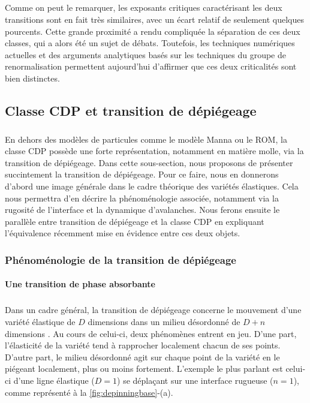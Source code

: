 \subparagraph{}Comme on peut le remarquer, les exposants critiques caractérisant les deux transitions sont en fait très similaires, avec un écart relatif de seulement quelques pourcents. Cette grande proximité a rendu compliquée la séparation de ces deux classes, qui a alors été un sujet de débats. Toutefois, les techniques numériques actuelles et des arguments analytiques basés sur les techniques du groupe de renormalisation permettent aujourd'hui d'affirmer que ces deux criticalités sont bien distinctes.

\subsection{Classe CDP et transition de dépiégeage}

\subparagraph{}En dehors des modèles de particules comme le modèle Manna ou le ROM, la classe CDP possède une forte représentation, notamment en matière molle, via la transition de dépiégeage. Dans cette sous-section, nous proposons de présenter succintement la transition de dépiégeage. Pour ce faire, nous en donnerons d'abord une image générale dans le cadre théorique des variétés élastiques. Cela nous permettra d'en décrire la phénoménologie associée, notamment via la rugosité de l'interface et la dynamique d'avalanches. Nous ferons ensuite le parallèle entre transition de dépiégeage et la classe CDP en expliquant l'équivalence récemment mise en évidence entre ces deux objets.

\subsubsection{Phénoménologie de la transition de dépiégeage}

\paragraph{Une transition de phase absorbante}

\subparagraph{}Dans un cadre général, la transition de dépiégeage concerne le mouvement d'une variété élastique de $D$ dimensions dans un milieu désordonné de $D+n$ dimensions \cite{fisher_collective_1998}. Au cours de celui-ci, deux phénomènes entrent en jeu. D'une part, l'élasticité de la variété tend à rapprocher localement chacun de ses points. D'autre part, le milieu désordonné agit sur chaque point de la variété en le piégeant  localement, plus ou moins fortement. L'exemple le plus parlant est celui-ci d'une ligne élastique ($D=1$) se déplaçant sur une interface rugueuse ($n=1$), comme représenté à la \autoref{fig:depinningbase}-(a).

